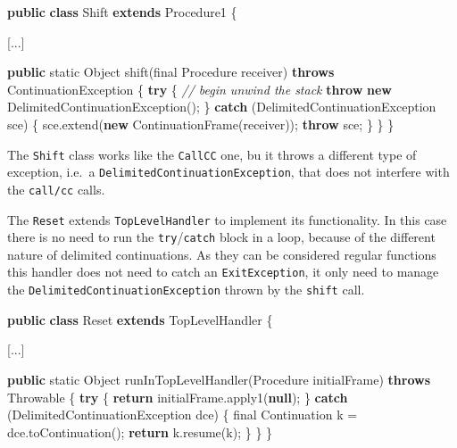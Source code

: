 \documentclass[12pt,a4paper,oneside,openright]{book}
\newenvironment{Shaded}{\begin{snugshade}}{\end{snugshade}}
\newcommand{\KeywordTok}[1]{\textcolor[rgb]{0.13,0.29,0.53}{\textbf{{#1}}}}
\newcommand{\DataTypeTok}[1]{\textcolor[rgb]{0.13,0.29,0.53}{{#1}}}
\newcommand{\CommentTok}[1]{\textcolor[rgb]{0.56,0.35,0.01}{\textit{{#1}}}}
\newcommand{\FunctionTok}[1]{\textcolor[rgb]{0.00,0.00,0.00}{{#1}}}
\newcommand{\NormalTok}[1]{{#1}}
\begin{document}
\begin{Shaded}
\begin{Highlighting}[]
\KeywordTok{public} \KeywordTok{class} \NormalTok{Shift }\KeywordTok{extends} \NormalTok{Procedure1 \{}

    \NormalTok{[...]}

    \KeywordTok{public} \DataTypeTok{static} \NormalTok{Object }\FunctionTok{shift}\NormalTok{(}\DataTypeTok{final} \NormalTok{Procedure receiver)}
        \KeywordTok{throws} \NormalTok{ContinuationException \{}
        \KeywordTok{try} \NormalTok{\{}
            \CommentTok{// begin unwind the stack}
            \KeywordTok{throw} \KeywordTok{new} \FunctionTok{DelimitedContinuationException}\NormalTok{();}
        \NormalTok{\} }\KeywordTok{catch} \NormalTok{(DelimitedContinuationException sce) \{}
            \NormalTok{sce.}\FunctionTok{extend}\NormalTok{(}\KeywordTok{new} \FunctionTok{ContinuationFrame}\NormalTok{(receiver));}
            \KeywordTok{throw} \NormalTok{sce;}
        \NormalTok{\}}
    \NormalTok{\}}
\NormalTok{\}}
\end{Highlighting}
\end{Shaded}

The \texttt{Shift} class works like the \texttt{CallCC} one, bu it
throws a different type of exception, i.e.~a
\texttt{DelimitedContinuationException}, that does not interfere with
the \texttt{call/cc} calls.

The \texttt{Reset} extends \texttt{TopLevelHandler} to implement its
functionality. In this case there is no need to run the
\texttt{try}/\texttt{catch} block in a loop, because of the different
nature of delimited continuations. As they can be considered regular
functions this handler does not need to catch an \texttt{ExitException},
it only need to manage the \texttt{DelimitedContinuationException}
thrown by the \texttt{shift} call.

\begin{Shaded}
\begin{Highlighting}[]
\KeywordTok{public} \KeywordTok{class} \NormalTok{Reset }\KeywordTok{extends} \NormalTok{TopLevelHandler \{}

    \NormalTok{[...]}

    \KeywordTok{public} \DataTypeTok{static} \NormalTok{Object }\FunctionTok{runInTopLevelHandler}\NormalTok{(Procedure initialFrame)}
        \KeywordTok{throws} \NormalTok{Throwable \{}
        \KeywordTok{try} \NormalTok{\{}
            \KeywordTok{return} \NormalTok{initialFrame.}\FunctionTok{apply1}\NormalTok{(}\KeywordTok{null}\NormalTok{);}
        \NormalTok{\} }\KeywordTok{catch} \NormalTok{(DelimitedContinuationException dce) \{}
            \DataTypeTok{final} \NormalTok{Continuation k = dce.}\FunctionTok{toContinuation}\NormalTok{();}
            \KeywordTok{return} \NormalTok{k.}\FunctionTok{resume}\NormalTok{(k);}
        \NormalTok{\}}
    \NormalTok{\}}
\NormalTok{\}}
\end{Highlighting}
\end{Shaded}
\end{document}
